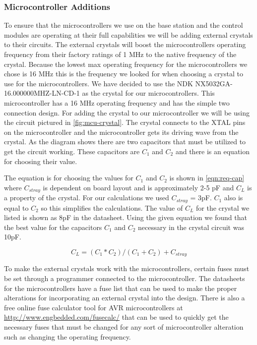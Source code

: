 \subsubsection{Microcontroller Additions}
To ensure that the microcontrollers we use on the base station and the control
modules are operating at their full capabilities we will be adding external
crystals to their circuits. The external crystals will boost the
microcontrollers operating frequency from their factory ratings of 1 MHz to the
native frequency of the crystal.  Because the lowest max operating frequency
for the microcontrollers we chose is 16 MHz this is the frequency we looked for
when choosing a crystal to use for the microcontrollers. We have decided to use
the NDK NX5032GA{}-16.000000MHZ{}-LN{}-CD{}-1 as the crystal for our
microcontrollers. This microcontroller has a 16 MHz operating frequency and has
the simple two connection design. For adding the crystal to our microcontroller
we will be using the circuit pictured in \autoref{fig:mcu-crystal}. The crystal
connects to the XTAL pins on the microcontroller and the microcontroller gets
its driving wave from the crystal. As the diagram shows there are two
capacitors that must be utilized to get the circuit working. These capacitors
are $C_{1}$ and $C_{2}$ and there is an equation for
choosing their value.


The equation is for choosing the values for $C_{1}$ and
$C_{2}$ is shown in \autoref{eqn:req-cap} where
$C_{stray}$ is dependent on board layout and is approximately 2-5 pF
and $C_{L}$ is a property of the crystal. For our calculations we
used $C_{stray}$ = 3pF. $C_{1}$ also is equal to
$C_{2}$ so this simplifies the calculations. The value of
$C_{L}$ for the crystal we listed is shown as 8pF in the datasheet.
Using the given equation we found that the best value for the capacitors
$C_{1}$ and $C_{2}$ necessary in the crystal circuit was
10pF.

\begin{equation}
  C_{L} = (C_1 * C_2) / (C_1+C_2) + C_{stray}
\label{eqn:req-cap}
\end{equation}

To make the external crystals work with the microcontrollers, certain fuses
must be set through a programmer connected to the microcontroller. The
datasheets for the microcontrollers have a fuse list that can be used to make
the proper alterations for incorporating an external crystal into the design.
There is also a free online fuse calculator tool for AVR microcontrollers at
\url{http://www.engbedded.com/fusecalc/} that can be used to quickly get the
necessary fuses that must be changed for any sort of microcontroller alteration
such as changing the operating frequency.

